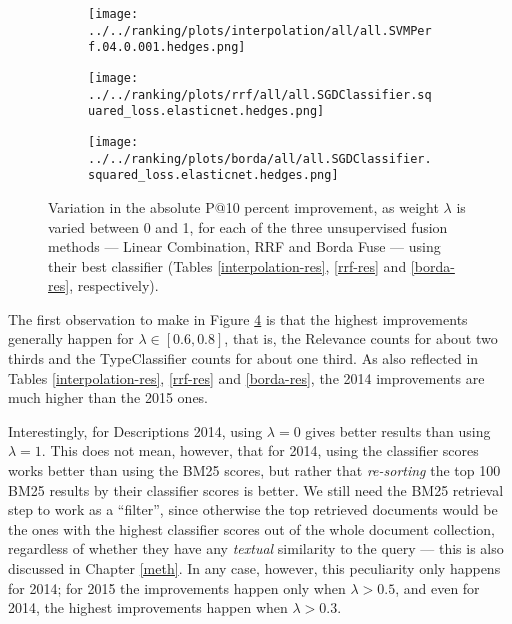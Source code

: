 \begin{figure}

\begin{subfigure}[b]{\textwidth}
 \centerline {
  \hspace*{1.5cm}\texttt{[image: ../../ranking/plots/interpolation/all/all.SVMPerf.04.0.001.hedges.png]}
  }
  \label{interp-weight}
\end{subfigure}
\begin{subfigure}[b]{\textwidth}
\centerline{
  \hspace*{1.5cm}\texttt{[image: ../../ranking/plots/rrf/all/all.SGDClassifier.squared\_loss.elasticnet.hedges.png]}
  }
  \label{rrf-weight}
\end{subfigure}
\begin{subfigure}[b]{\textwidth}
\centerline{
  \hspace*{1.5cm}\texttt{[image: ../../ranking/plots/borda/all/all.SGDClassifier.squared\_loss.elasticnet.hedges.png]}
  }
  \label{borda-weight}
\end{subfigure}

 \caption{Variation in the absolute P@10 percent improvement, as weight $\lambda$ is varied between 0 and 1, for each of the three unsupervised
fusion methods --- Linear Combination, RRF and Borda Fuse --- using their best classifier (Tables \ref{interpolation-res}, \ref{rrf-res}
and \ref{borda-res}, respectively).}
 \label{lambda-vary}

\end{figure}

The first observation to make in Figure \ref{lambda-vary} is that the highest improvements generally happen for $\lambda \in [0.6, 0.8]$,
that is, the \textsf{Relevance} counts for about two thirds
and the \textsf{TypeClassifier} counts for about one third.
As also reflected in Tables \ref{interpolation-res}, \ref{rrf-res} and \ref{borda-res}, the 2014 improvements are much higher than
the 2015 ones.

Interestingly, for Descriptions 2014, using $\lambda = 0$ gives better results
than using $\lambda=1$. This does not mean, however, that for 2014, using the classifier scores
works better than using the BM25 scores, but rather that
\emph{re-sorting} the top 100 BM25 results by their classifier scores is better.
We still need the BM25 retrieval step to work as a ``filter'',
since otherwise the top retrieved documents would be the ones with the highest classifier scores out of the whole document collection,
regardless of whether
they have any \emph{textual} similarity to the query --- this is also discussed in Chapter \ref{meth}.
In any case,  however, this peculiarity only happens for 2014; for 2015 the improvements happen only when $\lambda>0.5$,
and even for 2014, the highest improvements happen when $\lambda>0.3$.

